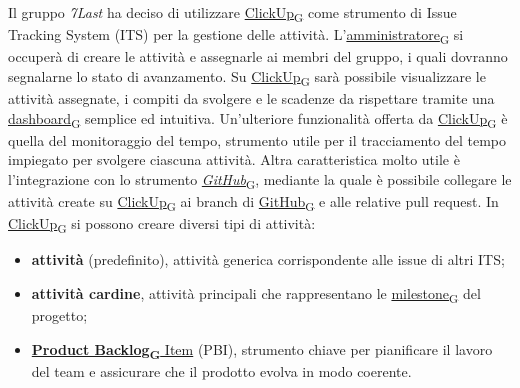 Il gruppo \textit{7Last} ha deciso di utilizzare \href{https://7last.github.io/docs/rtb/documentazione-interna/glossario\#clickup}{ClickUp\textsubscript{G}} come strumento di Issue Tracking System (ITS) per la gestione delle attività. L'\href{https://7last.github.io/docs/rtb/documentazione-interna/glossario\#amministratore}{amministratore\textsubscript{G}} si occuperà di creare le attività e assegnarle ai membri del gruppo, i quali dovranno segnalarne lo stato di avanzamento. Su \href{https://7last.github.io/docs/rtb/documentazione-interna/glossario\#clickup}{ClickUp\textsubscript{G}} sarà possibile visualizzare le attività assegnate, i compiti da svolgere e le scadenze da rispettare tramite una \href{https://7last.github.io/docs/rtb/documentazione-interna/glossario\#dashboard}{dashboard\textsubscript{G}} semplice ed intuitiva. Un'ulteriore funzionalità offerta da \href{https://7last.github.io/docs/rtb/documentazione-interna/glossario\#clickup}{ClickUp\textsubscript{G}} è quella del monitoraggio del tempo, strumento utile per il tracciamento del tempo impiegato per svolgere ciascuna attività. Altra caratteristica molto utile è l'integrazione con lo strumento \href{https://7last.github.io/docs/rtb/documentazione-interna/glossario\#github}{\textit{GitHub}\textsubscript{G}}, mediante la quale è possibile collegare le attività create su \href{https://7last.github.io/docs/rtb/documentazione-interna/glossario\#clickup}{ClickUp\textsubscript{G}} ai branch di \href{https://7last.github.io/docs/rtb/documentazione-interna/glossario\#github}{GitHub\textsubscript{G}} e alle relative pull request.
In \href{https://7last.github.io/docs/rtb/documentazione-interna/glossario\#clickup}{ClickUp\textsubscript{G}} si possono creare diversi tipi di attività:
\begin{itemize}
    \item \textbf{attività} (predefinito), attività generica corrispondente alle issue di altri ITS;
    \item \textbf{attività cardine}, attività principali che rappresentano le \href{https://7last.github.io/docs/rtb/documentazione-interna/glossario\#milestone}{milestone\textsubscript{G}} del progetto;
    \item \href{https://7last.github.io/docs/rtb/documentazione-interna/glossario\#product-backlog}{\textbf{Product Backlog\textsubscript{G} }Item} (PBI), strumento chiave per pianificare il lavoro del team e assicurare che il prodotto evolva in modo coerente.
\end{itemize}
